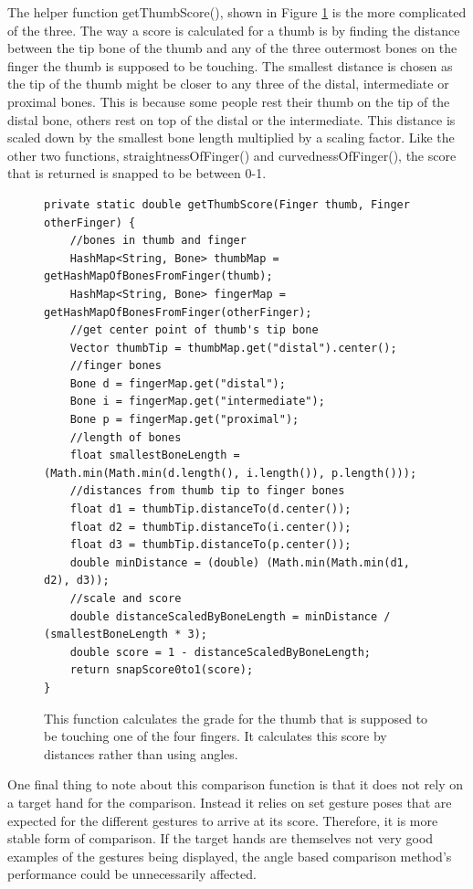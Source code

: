 The helper function getThumbScore(), shown in Figure \ref{fig:getThumbScore} is the more complicated of the three. The way a score is calculated for a thumb is by finding the distance between the tip bone of the thumb and any of the three outermost bones on the finger the thumb is supposed to be touching. The smallest distance is chosen as the tip of the thumb might be closer to any three of the distal, intermediate or proximal bones. This is because some people rest their thumb on the tip of the distal bone, others rest on top of the distal or the intermediate. This distance is scaled down by the smallest bone length multiplied by a scaling factor. Like the other two functions, straightnessOfFinger() and curvednessOfFinger(), the score that is returned is snapped to be between 0-1. 
\begin{figure}[H]
\centering
\begin{lstlisting}
private static double getThumbScore(Finger thumb, Finger otherFinger) {
	//bones in thumb and finger
	HashMap<String, Bone> thumbMap = getHashMapOfBonesFromFinger(thumb);
	HashMap<String, Bone> fingerMap = getHashMapOfBonesFromFinger(otherFinger);
	//get center point of thumb's tip bone
	Vector thumbTip = thumbMap.get("distal").center();
	//finger bones
	Bone d = fingerMap.get("distal");
	Bone i = fingerMap.get("intermediate");
	Bone p = fingerMap.get("proximal");
	//length of bones
	float smallestBoneLength = (Math.min(Math.min(d.length(), i.length()), p.length()));
	//distances from thumb tip to finger bones
	float d1 = thumbTip.distanceTo(d.center());
	float d2 = thumbTip.distanceTo(i.center());
	float d3 = thumbTip.distanceTo(p.center());
	double minDistance = (double) (Math.min(Math.min(d1, d2), d3));
	//scale and score
	double distanceScaledByBoneLength = minDistance / (smallestBoneLength * 3);
	double score = 1 - distanceScaledByBoneLength;
	return snapScore0to1(score);
}
\end{lstlisting}
\caption[getThumbScore() Helper Function]{This function calculates the grade for the thumb that is supposed to be touching one of the four fingers. It calculates this score by distances rather than using angles.}
\label{fig:getThumbScore}
\end{figure}

One final thing to note about this comparison function is that it does not rely on a target hand for the comparison. Instead it relies on set gesture poses that are expected for the different gestures to arrive at its score. Therefore, it is more stable form of comparison. If the target hands are themselves not very good examples of the gestures being displayed, the angle based comparison method's performance could be unnecessarily affected. 

